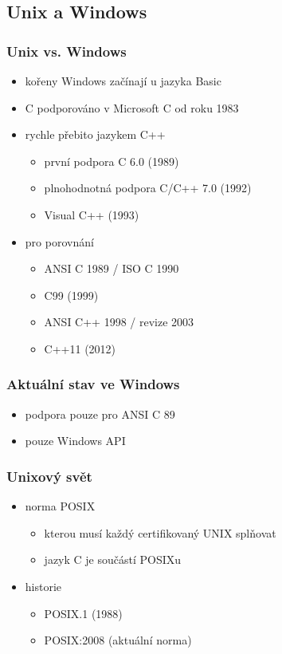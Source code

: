 \subsection{Unix a Windows}
\begin{frame}
	\frametitle{Unix vs. Windows}
	\begin{itemize}
		\item{kořeny Windows začínají u jazyka Basic}
		\item{C podporováno v Microsoft C od roku 1983}
		\item{rychle přebito jazykem C++}\pause
		\begin{itemize}
			\item{první podpora C 6.0 (1989)}
			\item{plnohodnotná podpora C/C++ 7.0 (1992)}
			\item{Visual C++ (1993)}
		\end{itemize}\pause
		\item{pro porovnání}
		\begin{itemize}
			\item{ANSI C 1989 / ISO C 1990}
			\item{C99 (1999)}
			\item{ANSI C++ 1998 / revize 2003}
			\item{C++11 (2012)}
		\end{itemize}
	\end{itemize}
\end{frame}

\begin{frame}
	\frametitle{Aktuální stav ve Windows}
	\begin{itemize}
		\item{podpora pouze pro ANSI C 89}
		\item{pouze Windows API}
	\end{itemize}
\end{frame}

\begin{frame}
	\frametitle{Unixový svět}
	\begin{itemize}
		\item{norma POSIX}
		\begin{itemize}
			\item{kterou musí každý certifikovaný UNIX splňovat}
			\item{jazyk C je součástí POSIXu}
		\end{itemize}
		\item{historie}
		\begin{itemize}
			\item{POSIX.1 (1988)}
			\item{POSIX:2008 (aktuální norma)}
		\end{itemize}
	\end{itemize}
\end{frame}

